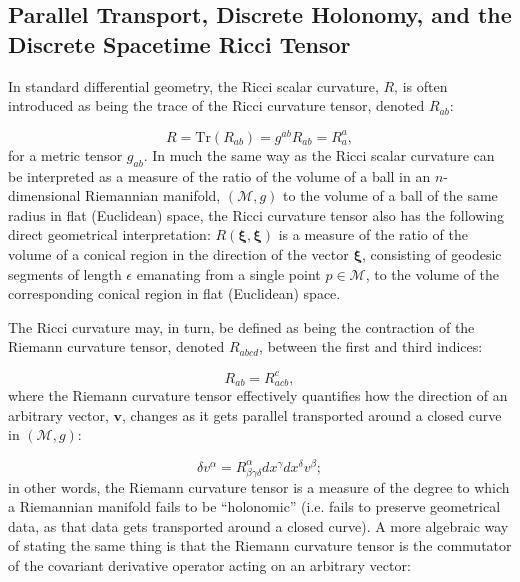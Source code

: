 \documentclass{article}
\begin{document}
\subsection{Parallel Transport, Discrete Holonomy, and the Discrete Spacetime Ricci Tensor}
\label{sec:CurrentStatus6}

In standard differential geometry, the Ricci scalar curvature, $R$, is often introduced as being the trace of the Ricci curvature tensor, denoted ${R_{a b}}$:

\begin{equation}
R = \mathrm{Tr} \left( R_{a b} \right) = g^{a b} R_{a b} = R_{a}^{a},
\end{equation}
for a metric tensor ${g_{a b}}$. In much the same way as the Ricci scalar curvature can be interpreted as a measure of the ratio of the volume of a ball in an $n$-dimensional Riemannian manifold, ${\left( \mathcal{M}, g \right)}$ to the volume of a ball of the same radius in flat (Euclidean) space, the Ricci curvature tensor also has the following direct geometrical interpretation: ${R \left( \boldsymbol\xi, \boldsymbol\xi \right)}$ is a measure of the ratio of the volume of a conical region in the direction of the vector ${\boldsymbol\xi}$, consisting of geodesic segments of length ${\epsilon}$ emanating from a single point ${p \in \mathcal{M}}$, to the volume of the corresponding conical region in flat (Euclidean) space.

The Ricci curvature may, in turn, be defined as being the contraction of the Riemann curvature tensor, denoted ${R_{a b c d}}$, between the first and third indices:

\begin{equation}
R_{a b} = R_{a c b}^{c},
\end{equation}
where the Riemann curvature tensor effectively quantifies how the direction of an arbitrary vector, ${\mathbf{v}}$, changes as it gets parallel transported around a closed curve in ${\left( \mathcal{M}, g \right)}$:

\begin{equation}
\delta v^{\alpha} = R_{\beta \gamma \delta}^{\alpha} d x^{\gamma} d x^{\delta} v^{\beta};
\end{equation}
in other words, the Riemann curvature tensor is a measure of the degree to which a Riemannian manifold fails to be ``holonomic'' (i.e. fails to preserve geometrical data, as that data gets transported around a closed curve). A more algebraic way of stating the same thing is that the Riemann curvature tensor is the commutator of the covariant derivative operator acting on an arbitrary vector:
\end{document}
